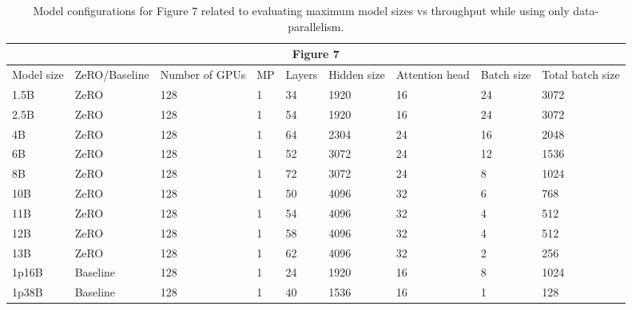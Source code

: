 \begin{table}[]
\scriptsize
\begin{tabular}{|l|l|l|l|l|l|l|l|l|}    
\hline
\multicolumn{9}{|c|}{Figure 7} \\ \hline
Model size & ZeRO/Baseline & Number of GPUs & MP & Layers & Hidden size & Attention head & Batch size & Total batch size \\ \hline
1.5B & ZeRO & 128 & 1 & 34 & 1920 & 16 & 24 & 3072 \\ \hline
2.5B & ZeRO & 128 & 1 & 54 & 1920 & 16 & 24 & 3072 \\ \hline
4B & ZeRO & 128 & 1 & 64 & 2304 & 24 & 16 & 2048 \\ \hline
6B & ZeRO & 128 & 1 & 52 & 3072 & 24 & 12 & 1536 \\ \hline
8B & ZeRO & 128 & 1 & 72 & 3072 & 24 & 8 & 1024 \\ \hline
10B & ZeRO & 128 & 1 & 50 & 4096 & 32 & 6 & 768 \\ \hline
11B & ZeRO & 128 & 1 & 54 & 4096 & 32 & 4 & 512 \\ \hline
12B & ZeRO & 128 & 1 & 58 & 4096 & 32 & 4 & 512 \\ \hline
13B & ZeRO & 128 & 1 & 62 & 4096 & 32 & 2 & 256 \\ \hline
1p16B & Baseline & 128 & 1 & 24 & 1920 & 16 & 8 & 1024 \\ \hline
1p38B & Baseline & 128 & 1 & 40 & 1536 & 16 & 1 & 128 \\ \hline
\end{tabular}
\caption{Model configurations for Figure 7 related to evaluating maximum model sizes vs throughput while using only data-parallelism.} \label{tab:fig7-tab}
\end{table}
